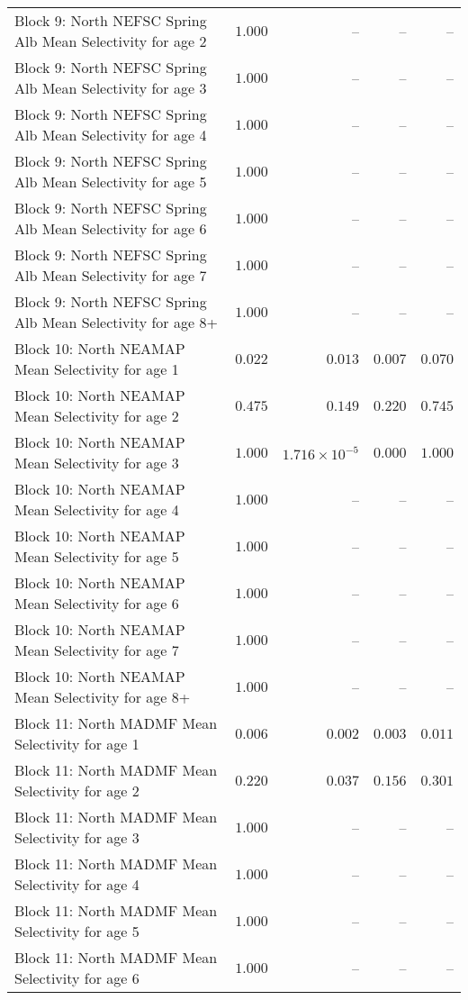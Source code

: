 \documentclass[
]{article}
\begin{document}
\begin{landscape}
\begin{longtable}[t]{lrrrr}
Block 9: North NEFSC Spring Alb Mean Selectivity for age 2 & $1.000$ & -- & -- & --\\
Block 9: North NEFSC Spring Alb Mean Selectivity for age 3 & $1.000$ & -- & -- & --\\
Block 9: North NEFSC Spring Alb Mean Selectivity for age 4 & $1.000$ & -- & -- & --\\
Block 9: North NEFSC Spring Alb Mean Selectivity for age 5 & $1.000$ & -- & -- & --\\
\addlinespace
Block 9: North NEFSC Spring Alb Mean Selectivity for age 6 & $1.000$ & -- & -- & --\\
Block 9: North NEFSC Spring Alb Mean Selectivity for age 7 & $1.000$ & -- & -- & --\\
Block 9: North NEFSC Spring Alb Mean Selectivity for age 8+ & $1.000$ & -- & -- & --\\
Block 10: North NEAMAP Mean Selectivity for age 1 & $0.022$ & $0.013$ & $0.007$ & $0.070$\\
Block 10: North NEAMAP Mean Selectivity for age 2 & $0.475$ & $0.149$ & $0.220$ & $0.745$\\
\addlinespace
Block 10: North NEAMAP Mean Selectivity for age 3 & $1.000$ & $1.716\times 10^{-5}$ & $0.000$ & $1.000$\\
Block 10: North NEAMAP Mean Selectivity for age 4 & $1.000$ & -- & -- & --\\
Block 10: North NEAMAP Mean Selectivity for age 5 & $1.000$ & -- & -- & --\\
Block 10: North NEAMAP Mean Selectivity for age 6 & $1.000$ & -- & -- & --\\
Block 10: North NEAMAP Mean Selectivity for age 7 & $1.000$ & -- & -- & --\\
\addlinespace
Block 10: North NEAMAP Mean Selectivity for age 8+ & $1.000$ & -- & -- & --\\
Block 11: North MADMF Mean Selectivity for age 1 & $0.006$ & $0.002$ & $0.003$ & $0.011$\\
Block 11: North MADMF Mean Selectivity for age 2 & $0.220$ & $0.037$ & $0.156$ & $0.301$\\
Block 11: North MADMF Mean Selectivity for age 3 & $1.000$ & -- & -- & --\\
Block 11: North MADMF Mean Selectivity for age 4 & $1.000$ & -- & -- & --\\
\addlinespace
Block 11: North MADMF Mean Selectivity for age 5 & $1.000$ & -- & -- & --\\
Block 11: North MADMF Mean Selectivity for age 6 & $1.000$ & -- & -- & --\\

\end{longtable}
\end{landscape}
\end{document}
